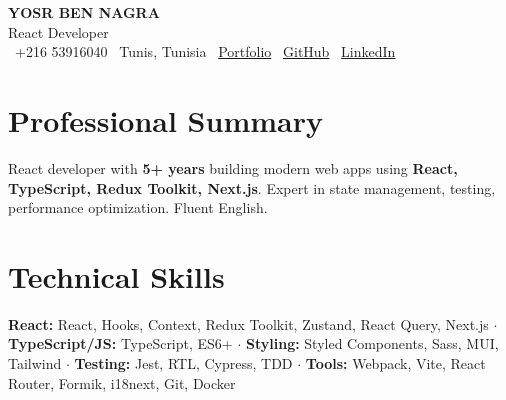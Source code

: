 \documentclass[10pt,a4paper]{article}
\begin{document}
\begin{center}
  {\Large\bfseries\color{primary} YOSR BEN NAGRA}\\[2pt]
  {\small\color{darkgray} React Developer}\\[3pt]
  {\footnotesize
    \faPhone\ +216 53916040 \quad
    \faMapMarker*\ Tunis, Tunisia \quad
    \faGlobe\ \href{https://portfolio-yosr.vercel.app/en}{Portfolio} \quad
    \faGithub\ \href{https://github.com/YosrBennagra}{GitHub} \quad
    \faLinkedin\ \href{https://www.linkedin.com/in/yosr-ben-nagra/}{LinkedIn}
  }
\end{center}

\section*{Professional Summary}
{\small
React developer with \textbf{5+ years} building modern web apps using \textbf{React, TypeScript, Redux Toolkit, Next.js}. Expert in state management, testing, performance optimization. Fluent English.
}

\vspace{6pt}

\section*{Technical Skills}
{\small
\textbf{React:} React, Hooks, Context, Redux Toolkit, Zustand, React Query, Next.js $\cdot$ \textbf{TypeScript/JS:} TypeScript, ES6+ $\cdot$ \textbf{Styling:} Styled Components, Sass, MUI, Tailwind $\cdot$ \textbf{Testing:} Jest, RTL, Cypress, TDD $\cdot$ \textbf{Tools:} Webpack, Vite, React Router, Formik, i18next, Git, Docker
}

\vspace{6pt}

\end{document}
